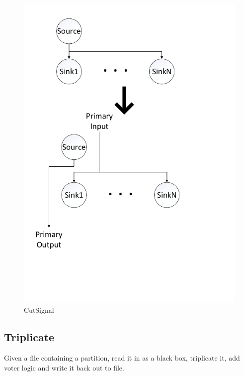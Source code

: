 \documentclass[12pt,final,oneside]{dwThesis} %
\begin{document}
   \begin{figure}

      \begin{center}

         \includegraphics[width=\linewidth]{images/CutSignal.pdf}
         \caption{CutSignal} \label{imCutSignal} 
      \end{center}

   \end{figure}

\newpage

   \subsection{Triplicate}
   \label{algTriplicate} Given a file containing a
   partition, read it in as a black box, triplicate it, add voter logic and
   write it back out to file.
\end{document}
